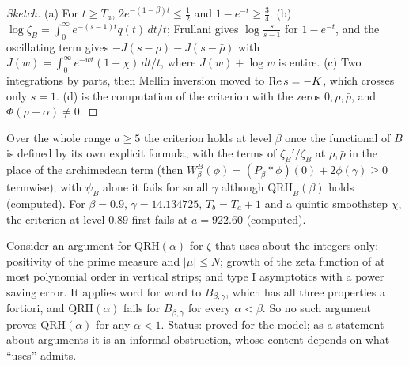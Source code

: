 \begin{proof}[Sketch]
(a) For $t\ge T_a$, $2e^{-(1-\beta)t}\le\frac12$ and $1-e^{-t}\ge\frac34$. (b) $\log\zeta_B=\int_0^\infty e^{-(s-1)t}q(t)\,dt/t$; Frullani gives $\log\frac s{s-1}$ for $1-e^{-t}$, and the oscillating term gives $-J(s-\rho)-J(s-\bar\rho)$ with $J(w)=\int_0^\infty e^{-wt}(1-\chi)\,dt/t$, where $J(w)+\log w$ is entire. (c) Two integrations by parts, then Mellin inversion moved to $\operatorname{Re} s=-K$, which crosses only $s=1$. (d) is the computation of the criterion with the zeros $0,\rho,\bar\rho$, and $\Phi(\rho-\alpha)\ne0$. \qedhere
\end{proof}

Over the whole range $a\ge5$ the criterion holds at level $\beta$ once the functional of $B$ is defined by its own explicit formula, with the terms of $\zeta_B'/\zeta_B$ at $\rho,\bar\rho$ in the place of the archimedean term (then $W^B_\beta(\phi)=(P_\beta*\phi)(0)+2\phi(\gamma)\ge0$ termwise); with $\psi_B$ alone it fails for small $\gamma$ although $\mathrm{QRH}_B(\beta)$ holds (computed). For $\beta=0.9$, $\gamma=14.134725$, $T_b=T_a+1$ and a quintic smoothstep $\chi$, the criterion at level $0.89$ first fails at $a=922.60$ (computed).

\begin{corollary}[barrier]\label{rg:cor:barrier}
Consider an argument for $\mathrm{QRH}(\alpha)$ for $\zeta$ that uses about the integers only: positivity of the prime measure and $|\mu|\le N$; growth of the zeta function of at most polynomial order in vertical strips; and type I asymptotics with a power saving error. It applies word for word to $B_{\beta,\gamma}$, which has all three properties a fortiori, and $\mathrm{QRH}(\alpha)$ fails for $B_{\beta,\gamma}$ for every $\alpha<\beta$. So no such argument proves $\mathrm{QRH}(\alpha)$ for any $\alpha<1$. Status: proved for the model; as a statement about arguments it is an informal obstruction, whose content depends on what ``uses'' admits.
\end{corollary}

